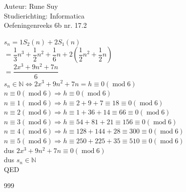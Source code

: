 \documentclass[a4paper]{article}
\begin{document}
  
\noindent \large Auteur: Rune Suy \\
\noindent \large Studierichting: Informatica\\
\noindent \large Oefeningenreeks 6b nr. 17.2\\

\medskip

\normalsize

$s_n = 1 S_2(n) + 2 S_1(n)$\\

$ = \dfrac{1}{3}n^3 + \dfrac{1}{2}n^2 + \dfrac{1}{6}n + 2 \left( \dfrac{1}{2}n^2 + \dfrac{1}{2}n \right)$\\

$ = \dfrac{2x^3 + 9n^2 + 7n}{6}$\\

$s_n \in \mathbb{N} \Leftrightarrow 2x^3 + 9n^2 + 7n = h \equiv 0 (\operatorname{mod} 6) $\\

$n \equiv 0 (\operatorname{mod} 6) \Rightarrow h \equiv 0 (\operatorname{mod} 6)$\\

$n \equiv 1 (\operatorname{mod} 6) \Rightarrow h \equiv 2+9+7 \equiv 18 \equiv 0 (\operatorname{mod} 6)$\\

$n \equiv 2 (\operatorname{mod} 6) \Rightarrow h \equiv 1+36+14 \equiv 66 \equiv 0 (\operatorname{mod} 6)$\\

$n \equiv 3 (\operatorname{mod} 6) \Rightarrow h \equiv 54+81+21 \equiv 156 \equiv 0 (\operatorname{mod} 6)$\\

$n \equiv 4 (\operatorname{mod} 6) \Rightarrow h \equiv 128+144+28 \equiv 300 \equiv 0 (\operatorname{mod} 6)$\\

$n \equiv 5 (\operatorname{mod} 6) \Rightarrow h \equiv 250 + 225 + 35 \equiv 510 \equiv 0 (\operatorname{mod} 6)$\\

dus $2x^3 + 9n^2 + 7n \equiv 0 (\operatorname{mod} 6) $\\

dus $s_n \in \mathbb{N}$\\

QED\\

\begin{thebibliography}{999}
\end{thebibliography}
\end{document}
